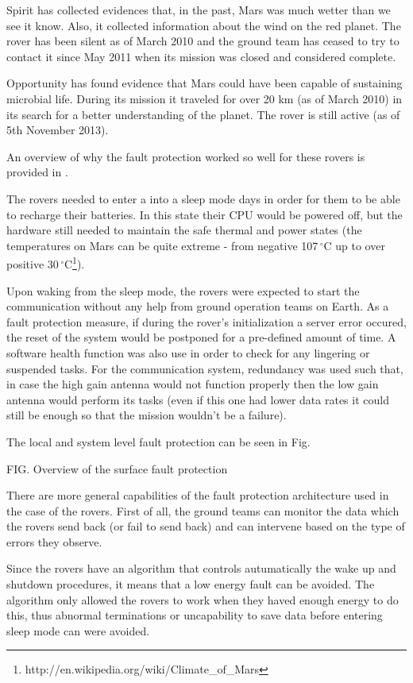 Spirit has collected evidences that, in the past, Mars was much wetter than we
see it know. Also, it collected information about the wind on the red planet.
The rover has been silent as of March 2010 and the ground team has ceased to try
to contact it since May 2011 when its mission was closed and considered
complete.

Opportunity has found evidence that Mars could have been capable of sustaining
microbial life. During its mission it traveled for over 20 km (as of March 2010)
in its search for a better understanding of the planet. The rover is still
active (as of 5th November 2013).

An overview of why the fault protection worked so well for these rovers is
provided in \cite{surv-nasa-mars}.

The rovers needed to enter a into a sleep mode days in order for them to be able
to recharge their batteries. In this state their CPU would be powered off, but
the hardware still needed to maintain the safe thermal and power states (the
temperatures on Mars can be quite extreme - from negative
107$\,^{\circ}\mathrm{C}$ up to over positive
30$\,^{\circ}\mathrm{C}$\footnote{http://en.wikipedia.org/wiki/Climate\_of\_Mars}).

Upon waking from the sleep mode, the rovers were expected to start the
communication without any help from ground operation teams on Earth. As a fault
protection measure, if during the rover's initialization a server error occured,
the reset of the system would be postponed for a pre-defined amount of time. A
software health function was also use in order to check for any lingering or
suspended tasks. For the communication system, redundancy was used such that, in
case the high gain antenna would not function properly then the low gain antenna
would perform its tasks (even if this one had lower data rates it could still be
enough so that the mission wouldn't be a failure).

The local and system level fault protection can be seen in Fig. \cite{fprot}

FIG. Overview of the surface fault protection

There are more general capabilities of the fault protection architecture used in
the case of the rovers. First of all, the ground teams can monitor the data
which the rovers send back (or fail to send back) and can intervene based on the
type of errors they observe.

Since the rovers have an algorithm that controls autumatically the wake up and
shutdown procedures, it means that a low energy fault can be avoided. The
algorithm only allowed the rovers to work when they haved enough energy to do
this, thus abnormal terminations or uncapability to save data before entering
sleep mode can were avoided. 


